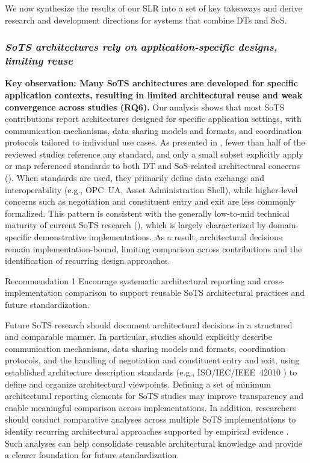 \addblockbegin{}

We now synthesize the results of our SLR into a set of key takeaways and derive research and development directions for systems that combine DTs and SoS.

\subsubsection{\textit{SoTS architectures rely on application-specific designs, limiting reuse}}

\textbf{Key observation: Many SoTS architectures are developed for specific application contexts, resulting in limited architectural reuse and weak convergence across studies (RQ6).}
Our analysis shows that most SoTS contributions report architectures designed for specific application settings, with communication mechanisms, data sharing models and formats, and coordination protocols tailored to individual use cases. As presented in , fewer than half of the reviewed studies reference any standard, and only a small subset explicitly apply or map referenced standards to both DT and SoS-related architectural concerns (). When standards are used, they primarily define data exchange and interoperability (e.g., OPC~UA, Asset Administration Shell), while higher-level concerns such as negotiation and constituent entry and exit are less commonly formalized. This pattern is consistent with the generally low-to-mid technical maturity of current SoTS research (), which is largely characterized by domain-specific demonstrative implementations. As a result, architectural decisions remain implementation-bound, limiting comparison across contributions and the identification of recurring design approaches.

\begin{recoframe}{Recommendation 1}
Encourage systematic architectural reporting and cross-implementation comparison to support reusable SoTS architectural practices and future standardization.
\end{recoframe}

Future SoTS research should document architectural decisions in a structured and comparable manner. In particular, studies should explicitly describe communication mechanisms, data sharing models and formats, coordination protocols, and the handling of negotiation and constituent entry and exit, using established architecture description standards (e.g., ISO/IEC/IEEE~42010 \cite{iso42010}) to define and organize architectural viewpoints. Defining a set of minimum architectural reporting elements for SoTS studies may improve transparency and enable meaningful comparison across implementations. In addition, researchers should conduct comparative analyses across multiple SoTS implementations to identify recurring architectural approaches supported by empirical evidence \cite{cloutier2007applying}. Such analyses can help consolidate reusable architectural knowledge and provide a clearer foundation for future standardization.



